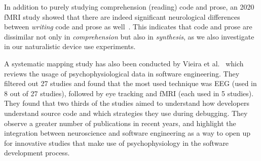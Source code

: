     In addition to purely studying comprehension (reading) code and prose, an 2020 fMRI study showed that there are indeed significant neurological differences between \emph{writing} code and prose as well~\cite{noauthor_neurological_nodate}. This indicates that code and prose are dissimilar not only in \emph{comprehension} but also in \emph{synthesis}, as we also investigate in our naturalistic device use experiments.


    A systematic mapping study has also been conducted by Vieira et al.~\cite{vieira_usage_2021} which reviews the usage of psychophysiological data in software engineering. They filtered out 27 studies and found that the most used technique was EEG (used in 8 out of 27 studies), followed by eye tracking and fMRI (each used in 5 studies). They found that two thirds of the studies aimed to understand how developers understand source code and which strategies they use during debugging. They observe a greater number of publications in recent years, and highlight the integration between neuroscience and software engineering as a way to open up for innovative studies that make use of psychophysiology in the software development process.

